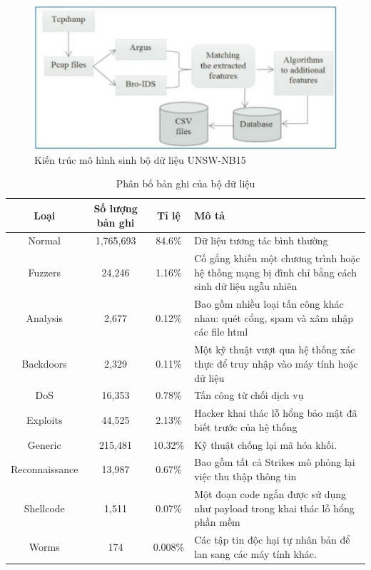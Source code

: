\begin{center}

	\begin{figure}[H]
		\includegraphics[scale=0.5]{images/Chap3-Figure1} 
		\caption{Kiến trúc mô hình sinh bộ dữ liệu UNSW-NB15 }
	\end{figure}

\end{center}
\begin{center}
    \begin{table}[H]
    
   	\begin{tabular}{|c|c|c|m{8cm}|}%
        \hline
        \textbf{Loại} & \textbf{Số lượng bản ghi} & \textbf{Tỉ lệ} &\textbf{Mô tả}\\
        \hline
        Normal & 1,765,693 & 84.6\% & Dữ liệu tương tác bình thường\\
        \hline
        Fuzzers & 24,246 & 1.16\% & Cố gắng khiến một chương trình hoặc hệ thống mạng bị đình chỉ bằng cách sinh dữ liệu ngẫu nhiên\\
        \hline
        Analysis & 2,677 & 0.12\% & Bao gồm nhiều loại tấn công khác nhau: quét cổng, spam và xâm nhập các file html\\
        \hline
        Backdoors & 2,329 & 0.11\% & Một kỹ thuật vượt qua hệ thống xác thực để truy nhập vào máy tính hoặc dữ liệu\\
        \hline
        DoS & 16,353 & 0.78\% &Tấn công từ chối dịch vụ\\
        \hline
        Exploits & 44,525 & 2.13\% &Hacker khai thác lỗ hổng bảo mật đã biết trước của hệ thống\\
        \hline
        Generic & 215,481 & 10.32\% & Kỹ thuật chống lại mã hóa khối.\\
        \hline
        Reconnaissance & 13,987 & 0.67\% & Bao gồm tất cả Strikes mô phỏng lại việc thu thập thông tin\\
        \hline
        Shellcode & 1,511 & 0.07\% & Một đoạn code ngắn được sử dụng như payload trong khai thác lỗ hổng phần mềm\\
        \hline
        Worms & 174 & 0.008\% &Các tập tin độc hại tự nhân bản để lan sang các máy tính khác.\\
        \hline
    \end{tabular}
    \caption{Phân bố bản ghi của bộ dữ liệu}
    \end{table}
\end{center}
\vspace{1cm}

